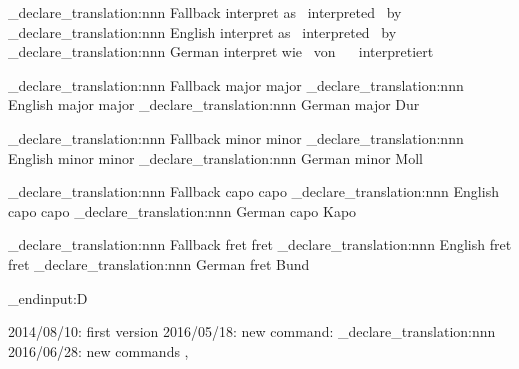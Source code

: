 \leadsheets_declare_translation:nnn {Fallback} {interpret}
  {as~ interpreted~ by~ }
\leadsheets_declare_translation:nnn {English}  {interpret}
  {as~ interpreted~ by~ }
\leadsheets_declare_translation:nnn {German}   {interpret}
  {wie~ von~ ~ interpretiert}

\leadsheets_declare_translation:nnn {Fallback} {major} {major}
\leadsheets_declare_translation:nnn {English}  {major} {major}
\leadsheets_declare_translation:nnn {German}   {major} {Dur}

\leadsheets_declare_translation:nnn {Fallback} {minor} {minor}
\leadsheets_declare_translation:nnn {English}  {minor} {minor}
\leadsheets_declare_translation:nnn {German}   {minor} {Moll}

\leadsheets_declare_translation:nnn {Fallback} {capo} {capo}
\leadsheets_declare_translation:nnn {English}  {capo} {capo}
\leadsheets_declare_translation:nnn {German}   {capo} {Kapo}

\leadsheets_declare_translation:nnn {Fallback} {fret} {fret}
\leadsheets_declare_translation:nnn {English}  {fret} {fret}
\leadsheets_declare_translation:nnn {German}   {fret} {Bund}

\tex_endinput:D

2014/08/10: first version
2016/05/18: new command: \leadsheets_declare_translation:nnn
2016/06/28: new commands \leadsheetstranslate, 
